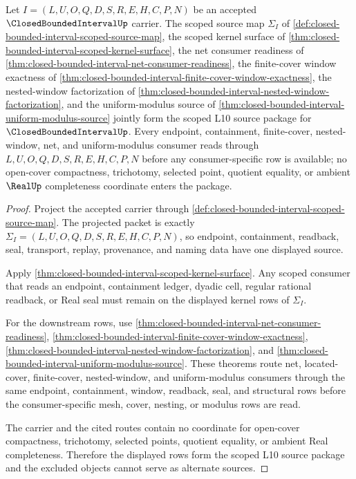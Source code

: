 \begin{theorem}
\label{thm:closed-bounded-interval-scoped-source-package}
Let $I=(L,U,O,Q,D,S,R,E,H,C,P,N)$ be an accepted $\ClosedBoundedIntervalUp$ carrier. The scoped source map $\Sigma_I$ of \autoref{def:closed-bounded-interval-scoped-source-map}, the scoped kernel surface of \autoref{thm:closed-bounded-interval-scoped-kernel-surface}, the net consumer readiness of \autoref{thm:closed-bounded-interval-net-consumer-readiness}, the finite-cover window exactness of \autoref{thm:closed-bounded-interval-finite-cover-window-exactness}, the nested-window factorization of \autoref{thm:closed-bounded-interval-nested-window-factorization}, and the uniform-modulus source of \autoref{thm:closed-bounded-interval-uniform-modulus-source} jointly form the scoped L10 source package for $\ClosedBoundedIntervalUp$. Every endpoint, containment, finite-cover, nested-window, net, and uniform-modulus consumer reads through $L,U,O,Q,D,S,R,E,H,C,P,N$ before any consumer-specific row is available; no open-cover compactness, trichotomy, selected point, quotient equality, or ambient $\RealUp$ completeness coordinate enters the package.
\end{theorem}
\begin{proof}
Project the accepted carrier through \autoref{def:closed-bounded-interval-scoped-source-map}. The projected packet is exactly $\Sigma_I=(L,U,O,Q,D,S,R,E,H,C,P,N)$, so endpoint, containment, readback, seal, transport, replay, provenance, and naming data have one displayed source.

Apply \autoref{thm:closed-bounded-interval-scoped-kernel-surface}. Any scoped consumer that reads an endpoint, containment ledger, dyadic cell, regular rational readback, or Real seal must remain on the displayed kernel rows of $\Sigma_I$.

For the downstream rows, use \autoref{thm:closed-bounded-interval-net-consumer-readiness}, \autoref{thm:closed-bounded-interval-finite-cover-window-exactness}, \autoref{thm:closed-bounded-interval-nested-window-factorization}, and \autoref{thm:closed-bounded-interval-uniform-modulus-source}. These theorems route net, located-cover, finite-cover, nested-window, and uniform-modulus consumers through the same endpoint, containment, window, readback, seal, and structural rows before the consumer-specific mesh, cover, nesting, or modulus rows are read.

The carrier and the cited routes contain no coordinate for open-cover compactness, trichotomy, selected points, quotient equality, or ambient Real completeness. Therefore the displayed rows form the scoped L10 source package and the excluded objects cannot serve as alternate sources.
\end{proof}

